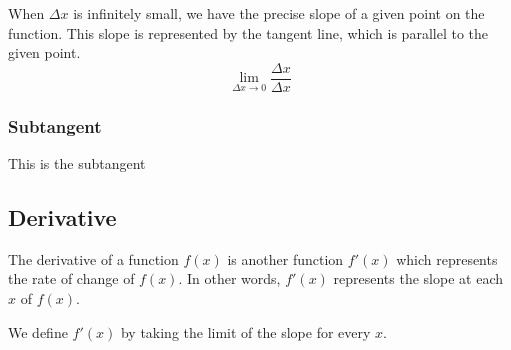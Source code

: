 \documentclass[a4paper]{article}
\begin{document}
\begin{minipage}{0.5\textwidth}
    When \(\Delta x\) is infinitely small, we have the precise slope of a given point
    on the function. This slope is represented by the tangent line, which is parallel to the given point.
    \[
        \lim_{\Delta x \to 0} \frac{\Delta x}{\Delta x}
    \]
\end{minipage}
\begin{minipage}{0.5\textwidth}
\end{minipage}

\subsubsection{Subtangent} %

This is the subtangent

\subsection{Derivative} %

The derivative of a function \(f(x)\) is another function \(f'(x)\) which
represents the rate of change of \(f(x)\). In other words, \(f'(x)\)
represents the slope at each \(x\) of \(f(x)\).

We define \(f'(x)\) by taking the limit of the slope for every \(x\).
\end{document}
